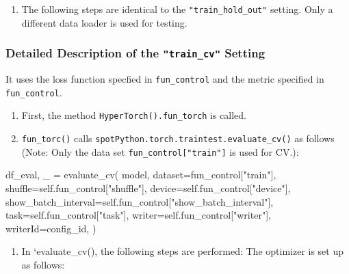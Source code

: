 \documentclass[
  letterpaper,
  DIV=11,
  numbers=noendperiod]{scrreprt}
\newenvironment{Shaded}{\begin{snugshade}}{\end{snugshade}}
\newcommand{\NormalTok}[1]{\textcolor[rgb]{0.00,0.23,0.31}{#1}}
\providecommand{\tightlist}{%
  \setlength{\itemsep}{0pt}\setlength{\parskip}{0pt}}\usepackage{longtable,booktabs,array}
\begin{document}
\begin{enumerate}
\def\labelenumi{\arabic{enumi}.}
\setcounter{enumi}{2}
\tightlist
\item
  The following steps are identical to the \texttt{"train\_hold\_out"}
  setting. Only a different data loader is used for testing.
\end{enumerate}

\hypertarget{detailed-description-of-the-train_cv-setting}{%
\subsubsection{\texorpdfstring{Detailed Description of the
\texttt{"train\_cv"}
Setting}{Detailed Description of the "train\_cv" Setting}}\label{detailed-description-of-the-train_cv-setting}}

It uses the loss function specfied in \texttt{fun\_control} and the
metric specified in \texttt{fun\_control}.

\begin{enumerate}
\def\labelenumi{\arabic{enumi}.}
\tightlist
\item
  First, the method \texttt{HyperTorch().fun\_torch} is called.
\item
  \texttt{fun\_torc()} calls
  \texttt{spotPython.torch.traintest.evaluate\_cv()} as follows (Note:
  Only the data set \texttt{fun\_control{[}"train"{]}} is used for CV.):
\end{enumerate}

\begin{Shaded}
\begin{Highlighting}[]
\NormalTok{df\_eval, \_ = evaluate\_cv(}
\NormalTok{    model,}
\NormalTok{    dataset=fun\_control["train"],}
\NormalTok{    shuffle=self.fun\_control["shuffle"],}
\NormalTok{    device=self.fun\_control["device"],}
\NormalTok{    show\_batch\_interval=self.fun\_control["show\_batch\_interval"],}
\NormalTok{    task=self.fun\_control["task"],}
\NormalTok{    writer=self.fun\_control["writer"],}
\NormalTok{    writerId=config\_id,}
\NormalTok{)}
\end{Highlighting}
\end{Shaded}

\begin{enumerate}
\def\labelenumi{\arabic{enumi}.}
\setcounter{enumi}{2}
\tightlist
\item
  In `evaluate\_cv(), the following steps are performed: The optimizer
  is set up as follows:
\end{enumerate}
\end{document}
